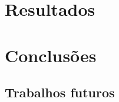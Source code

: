 \documentclass[
    12pt,
    oneside,
    a4paper,
    english,
    brazil
]{abntex2}
\begin{document}
\chapter{Resultados}\label{chap:result}

\chapter{Conclusões}\label{chap:concl}

\section{Trabalhos futuros}

\postextual


\end{document}
